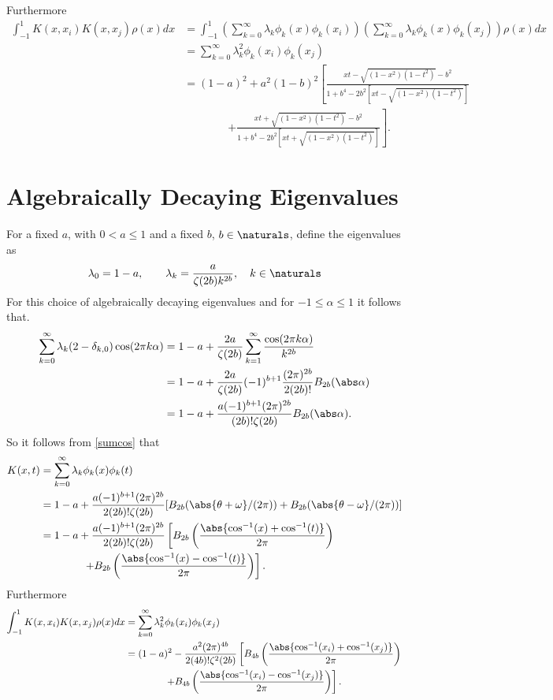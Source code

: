 \documentclass[]{elsarticle}
\theoremstyle{definition}
\begin{document}
Furthermore
\begin{align*}
\int_{-1}^1K(x,x_i)K(x,x_j)\rho(x)dx &= \int_{-1}^1\left(\sum_{k=0}^\infty\lambda_k\phi_k(x)\phi_k(x_i)\right)\left(\sum_{k=0}^\infty\lambda_k\phi_k(x)\phi_k(x_j)\right)\rho(x)dx\\
&= \sum_{k=0}^\infty\lambda_k^2\phi_k(x_i)\phi_k(x_j)\\
&= (1-a)^2 + a^2(1-b)^2\left[\frac{xt-\sqrt{(1-x^2)(1-t^2)}-b^2} {1+b^4 -2b^2[xt-\sqrt{(1-x^2)(1-t^2)}] } \right. \\
& \qquad \qquad \left .  + \frac{xt+\sqrt{(1-x^2)(1-t^2)}-b^2} {1+b^4 -2b^2[xt+\sqrt{(1-x^2)(1-t^2)}] }  \right].
\end{align*}

\section{Algebraically Decaying Eigenvalues}
For a fixed $a$, with $0<a\le 1$ and a fixed $b$, $b \in \naturals$, define the eigenvalues as
\begin{equation}
\lambda_0=1-a, \qquad \lambda_k = \frac{a}{\zeta(2b)k^{2b}}, \quad k \in \naturals
\end{equation}
For this choice of algebraically decaying eigenvalues and for $-1 \le \alpha \le 1$ it follows that.
\begin{align*}
\sum_{k=0}^{\infty} \lambda_k (2-\delta_{k,0}) \cos(2 \pi k\alpha)
&= 1-a + \frac{2a}{\zeta(2b)}\sum_{k=1}^{\infty} \frac{\cos(2 \pi k\alpha)}{k^{2b}}\\
&= 1-a + \frac{2a}{\zeta(2b)} (-1)^{b+1} \frac{(2 \pi)^{2b}} {2 (2b)!} B_{2b}(\abs\alpha) \\
&= 1-a + \frac{a (-1)^{b+1}(2 \pi)^{2b}}{(2b)!\zeta(2b)} B_{2b}(\abs\alpha).
\end{align*}
So it follows from \eqref{sumcos} that
\begin{align*}
K(x,t) &= \sum_{k=0}^{\infty} \lambda_k \phi_k(x)\phi_k(t) \\
&= 1-a + \frac{a (-1)^{b+1}(2 \pi)^{2b}}{2(2b)!\zeta(2b)} [B_{2b}(\abs{\theta + \omega}/(2\pi)) + B_{2b}(\abs{\theta - \omega}/(2\pi))]\\
&= 1-a + \frac{a (-1)^{b+1}(2 \pi)^{2b}}{2(2b)!\zeta(2b)} \left[B_{2b}\left(\frac{\abs{\cos^{-1}(x) + \cos^{-1}(t)}}{2\pi}\right) \right .  \\
& \qquad \qquad \left. + B_{2b}\left(\frac{\abs{\cos^{-1}(x) - \cos^{-1}(t)}}{2\pi}\right) \right].
\end{align*}
Furthermore
\begin{align*}
\int_{-1}^1K(x,x_i)K(x,x_j)\rho(x)dx &= \sum_{k=0}^\infty\lambda_k^2\phi_k(x_i)\phi_k(x_j)\\
&= (1-a)^2-\frac{a^2(2 \pi)^{4b}}{2(4b)!\zeta^2(2b)} \left[B_{4b}\left(\frac{\abs{\cos^{-1}(x_i) + \cos^{-1}(x_j)}}{2\pi}\right) \right .  \\
& \qquad \qquad \left. + B_{4b}\left(\frac{\abs{\cos^{-1}(x_i) - \cos^{-1}(x_j)}}{2\pi}\right) \right].
\end{align*}
\end{document}
